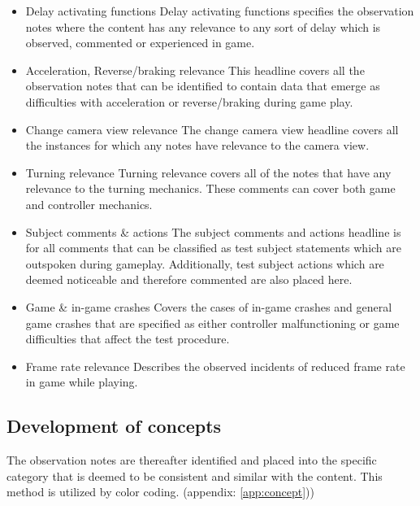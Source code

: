\begin{itemize}
	\item Delay activating functions\newline
		Delay activating functions specifies the observation notes where the content has any relevance to any sort of delay 			which is observed, commented or experienced in game.
	\item Acceleration, Reverse/braking relevance\newline
		This headline covers all the observation notes that can be identified to contain data that emerge as difficulties 				with acceleration or reverse/braking during game play. 
	\item Change camera view relevance\newline
		The change camera view headline covers all the instances for which any notes have relevance to the camera view.
	\item Turning relevance\newline
		Turning relevance covers all of the notes that have any relevance to the turning mechanics. These comments can cover 			both game and controller mechanics.
	\item Subject comments \& actions\newline
		The subject comments and actions headline is for all comments that can be classified as test subject statements which 		are outspoken during gameplay. Additionally, test subject actions which are deemed noticeable and therefore commented 		are also placed here.
	\item Game \& in-game crashes\newline
		Covers the cases of in-game crashes and general game crashes that are specified as either controller malfunctioning 			or game difficulties that affect the test procedure.
	\item Frame rate relevance\newline
		Describes the observed incidents of reduced frame rate in game while playing.
\end{itemize}


\subsection*{Development of concepts}
The observation notes are thereafter identified and placed into the specific category that is deemed to be consistent and similar with the content. 
This method is utilized by color coding. (appendix: \ref{app:concept}))

